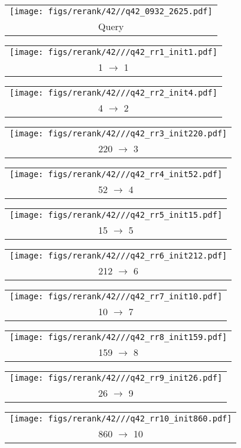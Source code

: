 \begin{figure*}[t]
\begin{tabular}{@{\sssp}c@{\sssp}}\texttt{[image: figs/rerank/42//q42\_0932\_2625.pdf]}\\Query\\ \end{tabular} 
\begin{tabular}{@{\sssp}c@{\sssp}}\texttt{[image: figs/rerank/42///q42\_rr1\_init1.pdf]}\\1 $\rightarrow$ 1\\ \end{tabular} 
\begin{tabular}{@{\sssp}c@{\sssp}}\texttt{[image: figs/rerank/42///q42\_rr2\_init4.pdf]}\\4 $\rightarrow$ 2\\ \end{tabular} 
\begin{tabular}{@{\sssp}c@{\sssp}}\texttt{[image: figs/rerank/42///q42\_rr3\_init220.pdf]}\\220 $\rightarrow$ 3\\ \end{tabular} 
\begin{tabular}{@{\sssp}c@{\sssp}}\texttt{[image: figs/rerank/42///q42\_rr4\_init52.pdf]}\\52 $\rightarrow$ 4\\ \end{tabular} 
\begin{tabular}{@{\sssp}c@{\sssp}}\texttt{[image: figs/rerank/42///q42\_rr5\_init15.pdf]}\\15 $\rightarrow$ 5\\ \end{tabular} 
\begin{tabular}{@{\sssp}c@{\sssp}}\texttt{[image: figs/rerank/42///q42\_rr6\_init212.pdf]}\\212 $\rightarrow$ 6\\ \end{tabular} 
\begin{tabular}{@{\sssp}c@{\sssp}}\texttt{[image: figs/rerank/42///q42\_rr7\_init10.pdf]}\\10 $\rightarrow$ 7\\ \end{tabular} 
\begin{tabular}{@{\sssp}c@{\sssp}}\texttt{[image: figs/rerank/42///q42\_rr8\_init159.pdf]}\\159 $\rightarrow$ 8\\ \end{tabular} 
\begin{tabular}{@{\sssp}c@{\sssp}}\texttt{[image: figs/rerank/42///q42\_rr9\_init26.pdf]}\\26 $\rightarrow$ 9\\ \end{tabular} 
\begin{tabular}{@{\sssp}c@{\sssp}}\texttt{[image: figs/rerank/42///q42\_rr10\_init860.pdf]}\\860 $\rightarrow$ 10\\ \end{tabular}  


\end{figure*}
